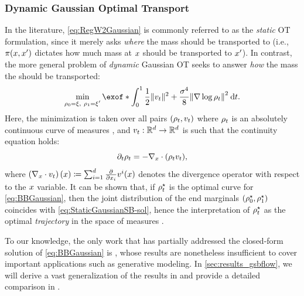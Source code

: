 \subsubsection{Dynamic Gaussian Optimal Transport}
\label{sec:dynamicGOT-BB}

In the literature, \eqref{eq:RegW2Gaussian} is commonly referred to as the \emph{static} \acrshort{OT} formulation, since it merely asks \emph{where} the mass should be transported to (i.e., $\pi(x,x')$ dictates how much mass at $x$ should be transported to $x'$). In contrast, the more general problem of \emph{dynamic} Gaussian \acrshort{OT} seeks to answer \emph{how} the mass the should be transported:
\begin{align}
\label{eq:BBGaussian}
\min_{\ssstyle\substack{{\measure[0] = \xi,\ \measure[\horizon] = \xi'}}} \exof*{\int_{0}^\horizon  \frac{1}{2} \norm{\vect}^2 + \frac{\sigma^4}{8} \norm*{\nabla\log\measure}^2 \dt}.
\end{align}Here, the minimization is taken over all pairs $(\rho_{t}, v_t)$ where $\rho_{t}$ is an absolutely continuous curve of measures \citep{ambrosio2006gradient}, and $v_t:\mathbb{R}^d\to\mathbb{R}^d$ is such that the continuity equation holds:
\begin{equation}
\label{eq:Coneq}
\partial_{t}\rho_{t} = - \nabla_{ {x} } \cdot(\rho_{t} v_t),
\end{equation}
where $\left(\nabla_{ {x} } \cdot v_t\right)(x) \coloneqq \sum_{i=1}^d \frac{\partial}{\partial x_i}v^{i}(x)$ denotes the divergence operator with respect to the $x$ variable. It can be shown that, if $\rho_{t}^\star$ is the optimal curve for \eqref{eq:BBGaussian}, then the joint distribution of the end marginals $(\rho^\star_0, \rho_1^\star)$ coincides with \eqref{eq:StaticGaussianSB-sol}, hence the interpretation of $\rho_{t}^\star$ as the optimal \emph{trajectory} in the space of measures  \citep{chen2016relation, gentil2017analogy, chen2021stochastic, gentil2020dynamical}.

To our knowledge, the only work that has partially addressed the closed-form solution of \eqref{eq:BBGaussian} is \citet{mallasto2021entropy}, whose results are nonetheless insufficient to cover important applications such as generative modeling. In \cref{sec:results_gsbflow}, we will derive a vast generalization of the results in \citet{mallasto2021entropy} and provide a detailed comparison in .


